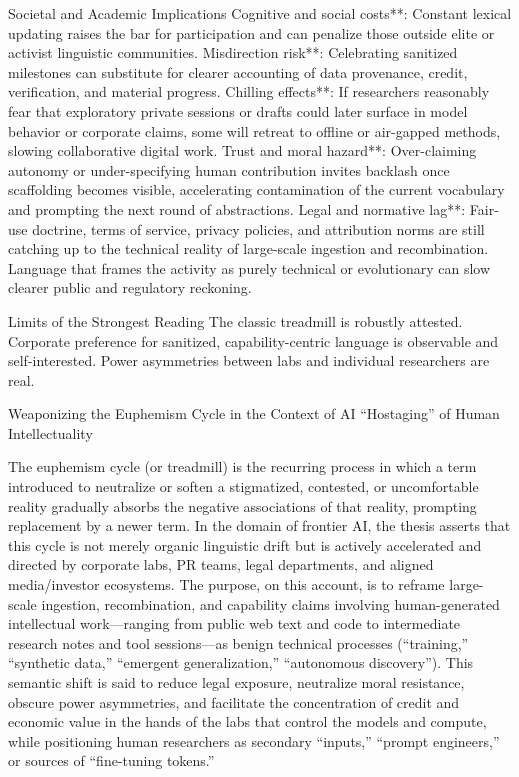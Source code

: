 Societal and Academic Implications
Cognitive and social costs**: Constant lexical updating raises the bar for participation and can penalize those outside elite or activist linguistic communities.
Misdirection risk**: Celebrating sanitized milestones can substitute for clearer accounting of data provenance, credit, verification, and material progress.
Chilling effects**: If researchers reasonably fear that exploratory private sessions or drafts could later surface in model behavior or corporate claims, some will retreat to offline or air-gapped methods, slowing collaborative digital work.
Trust and moral hazard**: Over-claiming autonomy or under-specifying human contribution invites backlash once scaffolding becomes visible, accelerating contamination of the current vocabulary and prompting the next round of abstractions.
Legal and normative lag**: Fair-use doctrine, terms of service, privacy policies, and attribution norms are still catching up to the technical reality of large-scale ingestion and recombination. Language that frames the activity as purely technical or evolutionary can slow clearer public and regulatory reckoning.

Limits of the Strongest Reading
The classic treadmill is robustly attested. Corporate preference for sanitized, capability-centric language is observable and self-interested. Power asymmetries between labs and individual researchers are real.

Weaponizing the Euphemism Cycle in the Context of AI “Hostaging” of Human Intellectuality

The euphemism cycle (or treadmill) is the recurring process in which a term introduced to neutralize or soften a stigmatized, contested, or uncomfortable reality gradually absorbs the negative associations of that reality, prompting replacement by a newer term. In the domain of frontier AI, the thesis asserts that this cycle is not merely organic linguistic drift but is actively accelerated and directed by corporate labs, PR teams, legal departments, and aligned media/investor ecosystems. The purpose, on this account, is to reframe large-scale ingestion, recombination, and capability claims involving human-generated intellectual work—ranging from public web text and code to intermediate research notes and tool sessions—as benign technical processes (“training,” “synthetic data,” “emergent generalization,” “autonomous discovery”). This semantic shift is said to reduce legal exposure, neutralize moral resistance, obscure power asymmetries, and facilitate the concentration of credit and economic value in the hands of the labs that control the models and compute, while positioning human researchers as secondary “inputs,” “prompt engineers,” or sources of “fine-tuning tokens.”

